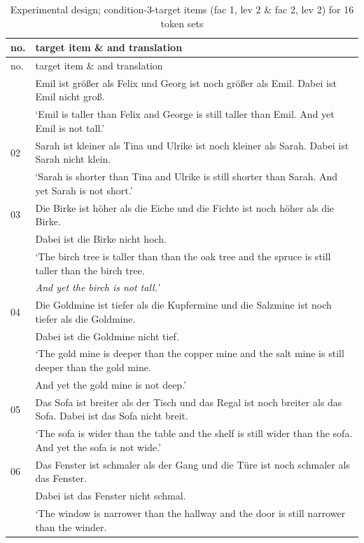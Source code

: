 \documentclass[output=paper]{langsci/langscibook}
\begin{document}
\begin{longtable}{lp{317.90625pt}}
\caption{Experimental design; condition-3-target items (fac 1, lev 2 \& fac 2, lev 2) for 16 token sets\label{tab:16_contexts}}\\
\lsptoprule no. & target item \& and translation\\\midrule\endfirsthead\midrule no. & target item \& and translation\\\midrule\endhead\endfoot\lspbottomrule\endlastfoot
01 & Emil ist größer als Felix und Georg ist noch größer als Emil. Dabei ist Emil nicht groß. \\
   & {`Emil is taller than Felix and George is still taller than Emil. And yet Emil is not tall.'}\\
\midrule
02 & Sarah ist kleiner als Tina und Ulrike ist noch kleiner als Sarah. Dabei ist Sarah nicht klein.\\
   & {`Sarah is shorter than Tina and Ulrike is still shorter than Sarah. And yet Sarah is not short.'}\\
\midrule
03 & Die Birke ist höher als die Eiche und die Fichte ist noch höher als die Birke. \\
   & Dabei ist die Birke nicht hoch.\\
   & {`The birch tree is taller than than the oak tree and the spruce is still taller than the birch tree.}\\
   & \textit{And yet the birch is not tall.'}\\
\midrule
04 & Die Goldmine ist tiefer als die Kupfermine und die Salzmine ist noch tiefer als die Goldmine. \\
   & Dabei ist die Goldmine nicht tief. \\
   & {`The gold mine is deeper than the copper mine and the salt mine is still deeper than the gold mine.} \\
   & {And yet the gold mine is not deep.'}\\
\midrule
05 & Das Sofa ist breiter als der Tisch und das Regal ist noch breiter als das Sofa. Dabei ist das Sofa nicht breit.\\
   & {`The sofa is wider than the table and the shelf is still wider than the sofa. And yet the sofa is not wide.'}\\
\midrule
06 & Das Fenster ist schmaler als der Gang und die Türe ist noch schmaler als das Fenster.\\
   & Dabei ist das Fenster nicht schmal.\\
   & {`The window is narrower than the hallway and the door is still narrower than the winder.} \\

\end{longtable}
\end{document}
